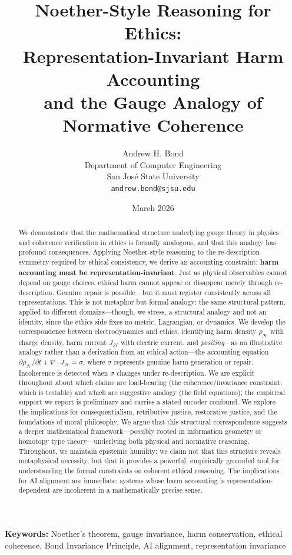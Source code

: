 \documentclass[12pt,letterpaper]{article}
\title{\textbf{Noether-Style Reasoning for Ethics:\\Representation-Invariant Harm Accounting\\and the Gauge Analogy of Normative Coherence}}
\author{Andrew H. Bond\\
Department of Computer Engineering\\
San Jos\'{e} State University\\
\texttt{andrew.bond@sjsu.edu}}
\date{March 2026}
\theoremstyle{definition}
\theoremstyle{remark}
\newcommand{\harm}{\mathcal{H}}
\begin{document}
\maketitle

\noindent\textbf{Keywords:} Noether's theorem, gauge invariance, harm conservation, ethical coherence, Bond Invariance Principle, AI alignment, representation invariance

\begin{abstract}
We demonstrate that the mathematical structure underlying gauge theory in physics and coherence verification in ethics is formally analogous, and that this analogy has profound consequences. Applying Noether-style reasoning to the re-description symmetry required by ethical consistency, we derive an accounting constraint: \textbf{harm accounting must be representation-invariant}. Just as physical observables cannot depend on gauge choices, ethical harm cannot appear or disappear merely through re-description. Genuine repair is possible---but it must register consistently across all representations. This is not metaphor but formal analogy: the same structural pattern, applied to different domains---though, we stress, a structural analogy and not an identity, since the ethics side fixes no metric, Lagrangian, or dynamics. We develop the correspondence between electrodynamics and ethics, identifying harm density $\rho_\harm$ with charge density, harm current $J_\harm$ with electric current, and \emph{positing}---as an illustrative analogy rather than a derivation from an ethical action---the accounting equation $\partial \rho_\harm / \partial t + \nabla \cdot J_\harm = \sigma$, where $\sigma$ represents genuine harm generation or repair. Incoherence is detected when $\sigma$ changes under re-description. We are explicit throughout about which claims are load-bearing (the coherence/invariance constraint, which is testable) and which are suggestive analogy (the field equations); the empirical support we report is preliminary and carries a stated encoder confound. We explore the implications for consequentialism, retributive justice, restorative justice, and the foundations of moral philosophy. We argue that this structural correspondence suggests a deeper mathematical framework---possibly rooted in information geometry or homotopy type theory---underlying both physical and normative reasoning. Throughout, we maintain epistemic humility: we claim not that this structure reveals metaphysical necessity, but that it provides a powerful, empirically grounded tool for understanding the formal constraints on coherent ethical reasoning. The implications for AI alignment are immediate: systems whose harm accounting is representation-dependent are incoherent in a mathematically precise sense.
\end{abstract}
\end{document}
